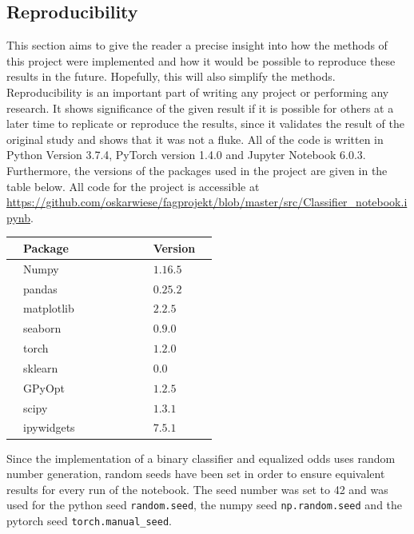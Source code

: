\documentclass[11pt, fleqn, titlepage]{article}
\begin{document}
	\subsection{Reproducibility}\label{repro}
	This section aims to give the reader a precise insight into how the methods of this project were implemented and how it would be possible to reproduce these results in the future. Hopefully, this will also simplify the methods. Reproducibility is an important part of writing any project or performing any research. It shows significance of the given result if it is possible for others at a later time to replicate or reproduce the results, since it validates the result of the original study and shows that it was not a fluke. All of the code is written in Python Version 3.7.4, PyTorch version 1.4.0 and Jupyter Notebook 6.0.3. Furthermore, the versions of the packages used in the project are given in the table below. All code for the project is accessible at \url{https://github.com/oskarwiese/fagprojekt/blob/master/src/Classifier_notebook.ipynb}.
	\begin{table}[H]
		\begin{center}
			\begin{tabular}{l l l l l l l l l l}
				\toprule
				& Package      & & & & & & & Version  & \\ \midrule
				& Numpy        & & & & & & & $1.16.5$ & \\
				& pandas       & & & & & & & $0.25.2$ & \\
				& matplotlib   & & & & & & & $2.2.5$  & \\
				& seaborn      & & & & & & & $0.9.0$  & \\
				& torch        & & & & & & & $1.2.0$  & \\
				& sklearn      & & & & & & & $0.0$    & \\
				& GPyOpt       & & & & & & & $1.2.5$  & \\
				& scipy        & & & & & & & $1.3.1$  & \\
				& ipywidgets   & & & & & & & $7.5.1$  & \\ \bottomrule
			\end{tabular}
		\end{center}
	\end{table}
	\noindent Since the implementation of a binary classifier and equalized odds uses random number generation, random seeds have been set in order to ensure equivalent results for every run of the notebook. The seed number was set to 42 and was used for the python seed \texttt{random.seed}, the numpy seed \texttt{np.random.seed} and the pytorch seed \texttt{torch.manual\_seed}.
	
\end{document}
